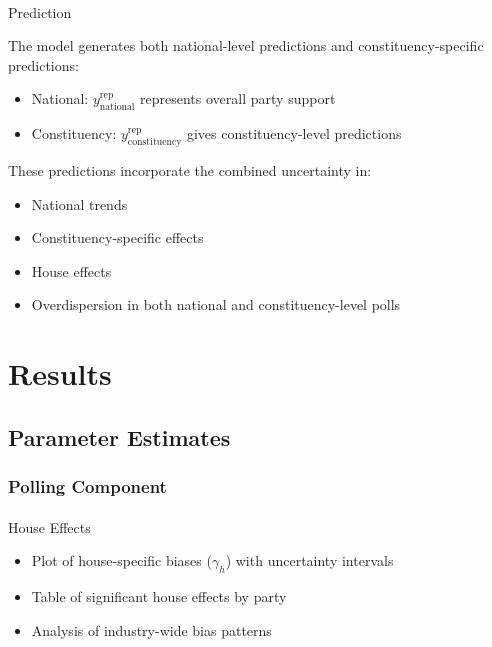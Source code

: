 \documentclass[
  letterpaper,
  DIV=11,
  numbers=noendperiod]{scrartcl}
\makeatletter
\let\oldparagraph\paragraph
\renewcommand{\paragraph}{
    \@ifstar
      \xxxParagraphStar
      \xxxParagraphNoStar
  }
\newcommand{\xxxParagraphStar}[1]{\oldparagraph*{#1}\mbox{}}
\newcommand{\xxxParagraphNoStar}[1]{\oldparagraph{#1}\mbox{}}
\providecommand{\tightlist}{%
  \setlength{\itemsep}{0pt}\setlength{\parskip}{0pt}}\usepackage{longtable,booktabs,array}
\makeatother
\begin{document}
\paragraph{Prediction}\label{prediction-1}

The model generates both national-level predictions and
constituency-specific predictions:

\begin{itemize}
\tightlist
\item
  National: \(y^{\text{rep}}_{\text{national}}\) represents overall
  party support
\item
  Constituency: \(y^{\text{rep}}_{\text{constituency}}\) gives
  constituency-level predictions
\end{itemize}

These predictions incorporate the combined uncertainty in:

\begin{itemize}
\tightlist
\item
  National trends
\item
  Constituency-specific effects
\item
  House effects
\item
  Overdispersion in both national and constituency-level polls
\end{itemize}

\section{Results}\label{results}

\subsection{Parameter Estimates}\label{parameter-estimates}

\subsubsection{Polling Component}\label{polling-component-1}

\paragraph{House Effects}\label{house-effects}

\begin{itemize}
\tightlist
\item
  Plot of house-specific biases (\(\gamma_{h}\)) with uncertainty
  intervals
\item
  Table of significant house effects by party
\item
  Analysis of industry-wide bias patterns
\end{itemize}
\end{document}
